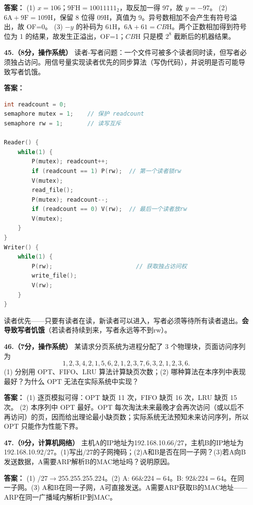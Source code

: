 \ifshowsolutions\par\noindent\textbf{答案：} (1) $x=106$；$9\text{FH}=10011111_2$，取反加一得 97，故 $y=-97$。
(2) $6\text{A}+9\text{F}=109\text{H}$，保留 8 位得 $09\text{H}$，真值为 9。异号数相加不会产生有符号溢出，故 OF=0。
(3) $-y$ 的补码为 $61\text{H}$，$6\text{A}+61=CB\text{H}$。两个正数相加得到符号位为 1 的结果，故发生正溢出，OF=1；$CB\text{H}$ 只是模 $2^8$ 截断后的机器结果。\else \answerarea[8] \fi

\vspace{8pt}

\noindent\textbf{45.（8分，操作系统）} 读者-写者问题：一个文件可被多个读者同时读，但写者必须独占访问。用信号量实现读者优先的同步算法（写伪代码），并说明是否可能导致写者饥饿。

\ifshowsolutions\par\noindent\textbf{答案：}
\begin{lstlisting}[language=C]
int readcount = 0;
semaphore mutex = 1;    // 保护 readcount
semaphore rw = 1;       // 读写互斥

Reader() {
    while(1) {
        P(mutex); readcount++;
        if (readcount == 1) P(rw);  // 第一个读者锁rw
        V(mutex);
        read_file();
        P(mutex); readcount--;
        if (readcount == 0) V(rw);  // 最后一个读者放rw
        V(mutex);
    }
}
Writer() {
    while(1) {
        P(rw);                        // 获取独占访问权
        write_file();
        V(rw);
    }
}
\end{lstlisting}
读者优先——只要有读者在读，新读者可以进入，写者必须等待所有读者退出。\textbf{会导致写者饥饿}（若读者持续到来，写者永远等不到rw）。\else \answerarea[8] \fi

\vspace{8pt}

\noindent\textbf{46.（7分，操作系统）} 某请求分页系统为进程分配了 3 个物理块，页面访问序列为
\[
1,2,3,4,2,1,5,6,2,1,2,3,7,6,3,2,1,2,3,6.
\]
(1) 分别用 OPT、FIFO、LRU 算法计算缺页次数；(2) 哪种算法在本序列中表现最好？为什么 OPT 无法在实际系统中实现？

\ifshowsolutions\par\noindent\textbf{答案：} (1) 逐页模拟可得：OPT 缺页 11 次，FIFO 缺页 16 次，LRU 缺页 15 次。
(2) 本序列中 OPT 最好。OPT 每次淘汰未来最晚才会再次访问（或以后不再访问）的页，因而给出理论最小缺页数；实际系统无法预知未来访问序列，所以 OPT 只能作为性能下界。\else \answerarea[8] \fi

\vspace{8pt}

\noindent\textbf{47.（9分，计算机网络）} 主机A的IP地址为192.168.10.66/27，主机B的IP地址为192.168.10.92/27。(1)写出/27的子网掩码；(2)A和B是否在同一子网？(3)若A向B发送数据，A需要ARP解析B的MAC地址吗？说明原因。

\ifshowsolutions\par\noindent\textbf{答案：} (1) /27$\to$255.255.255.224。(2) A: 66\&224$=64$。B: 92\&224$=64$。在同一子网。(3) A和B在同一子网，A可直接发送。A需要ARP获取B的MAC地址——ARP在同一广播域内解析IP到MAC。\else \answerarea[8] \fi
